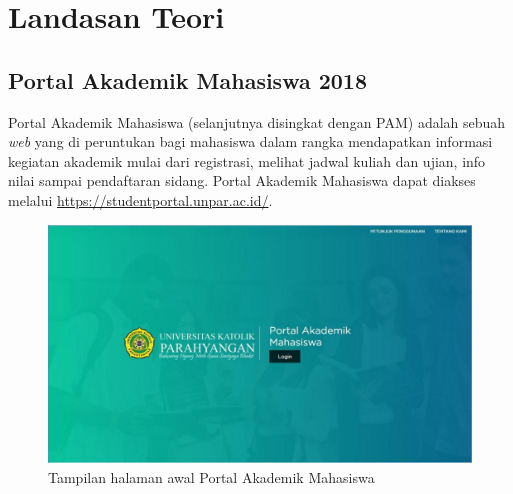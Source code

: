 \chapter{Landasan Teori}
\label{chap:teori}

\section{Portal Akademik Mahasiswa 2018}
\label{sec:pam} 
Portal Akademik Mahasiswa (selanjutnya disingkat dengan PAM) adalah sebuah \textit{web} yang di peruntukan bagi mahasiswa dalam rangka mendapatkan informasi kegiatan akademik mulai dari registrasi, melihat jadwal kuliah dan ujian, info nilai sampai pendaftaran sidang\cite{portalunpar}. Portal Akademik Mahasiswa dapat diakses melalui \url{https://studentportal.unpar.ac.id/}. 

\begin{figure}[H]
	\centering
	\includegraphics[scale=0.4]{Gambar/halaman2018.jpg}
	\caption{Tampilan halaman awal Portal Akademik Mahasiswa} 
	\label{fig:studpor_home_2018}
\end{figure}

